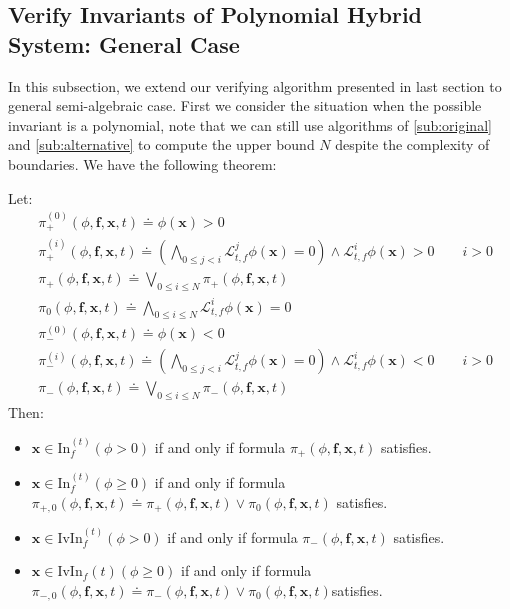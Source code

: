\documentclass{article}
\begin{document}
\subsection{Verify Invariants of Polynomial Hybrid System: General Case}
In this subsection, we extend our verifying algorithm presented in last section to general semi-algebraic case. First we consider the situation when the possible invariant is a polynomial, note that we can still use algorithms of \ref{sub:original} and \ref{sub:alternative} to compute the upper bound $N$ despite the complexity of boundaries. We have the following theorem: 
\begin{Theorem}
Let:
	\begin{align*}
		&\pi^{(0)}_+(\phi, \boldsymbol{f}, \boldsymbol{x}, t) \doteq \phi(\boldsymbol{x}) > 0 \\
		&\pi^{(i)}_+(\phi, \boldsymbol{f}, \boldsymbol{x}, t) \doteq (\bigwedge_{0 \leq j < i} \mathcal{L}_{t, f}^j \phi(\boldsymbol{x}) = 0) \wedge \mathcal{L}_{t, f}^i \phi(\boldsymbol{x}) > 0 \qquad i > 0 \\
		&\pi_+(\phi, \boldsymbol{f}, \boldsymbol{x}, t) \doteq \bigvee_{0 \leq i \leq N} \pi_+(\phi, \boldsymbol{f}, \boldsymbol{x}, t) \\
		&\pi_0(\phi, \boldsymbol{f}, \boldsymbol{x}, t) \doteq \bigwedge_{0 \leq i \leq N} \mathcal{L}_{t,f}^i \phi(\boldsymbol{x}) = 0 \\
		&\pi^{(0)}_-(\phi, \boldsymbol{f}, \boldsymbol{x}, t) \doteq \phi(\boldsymbol{x}) < 0 \\
		&\pi^{(i)}_-(\phi, \boldsymbol{f}, \boldsymbol{x}, t) \doteq (\bigwedge_{0 \leq j < i} \mathcal{L}_{t, f}^j \phi(\boldsymbol{x}) = 0) \wedge \mathcal{L}_{t, f}^i \phi(\boldsymbol{x}) < 0 \qquad i > 0 \\
		&\pi_-(\phi, \boldsymbol{f}, \boldsymbol{x}, t) \doteq \bigvee_{0 \leq i \leq N} \pi_-(\phi, \boldsymbol{f}, \boldsymbol{x}, t)
	\end{align*}
Then:
	\begin{itemize}
		\item $\boldsymbol{x} \in \mathrm{In}_f^{(t)}(\phi > 0)$ if and only if formula $\pi_+(\phi, \boldsymbol{f}, \boldsymbol{x}, t)$ satisfies.
		\item $\boldsymbol{x} \in \mathrm{In}_f^{(t)}(\phi \geq 0)$ if and only if formula $\pi_{+,0}(\phi, \boldsymbol{f}, \boldsymbol{x}, t) \doteq \pi_+(\phi, \boldsymbol{f}, \boldsymbol{x}, t) \vee \pi_0(\phi, \boldsymbol{f}, \boldsymbol{x}, t)$ satisfies.
		\item $\boldsymbol{x} \in \mathrm{IvIn}_f^{(t)}(\phi > 0)$ if and only if formula $\pi_-(\phi, \boldsymbol{f}, \boldsymbol{x}, t)$ satisfies.
		\item $\boldsymbol{x} \in \mathrm{IvIn}_f{(t)}(\phi \geq 0)$ if and only if formula $\pi_{-,0}(\phi, \boldsymbol{f}, \boldsymbol{x}, t) \doteq \pi_-(\phi, \boldsymbol{f}, \boldsymbol{x}, t) \vee \pi_0(\phi, \boldsymbol{f}, \boldsymbol{x}, t)$satisfies.
	\end{itemize}
\end{Theorem}
\end{document}
